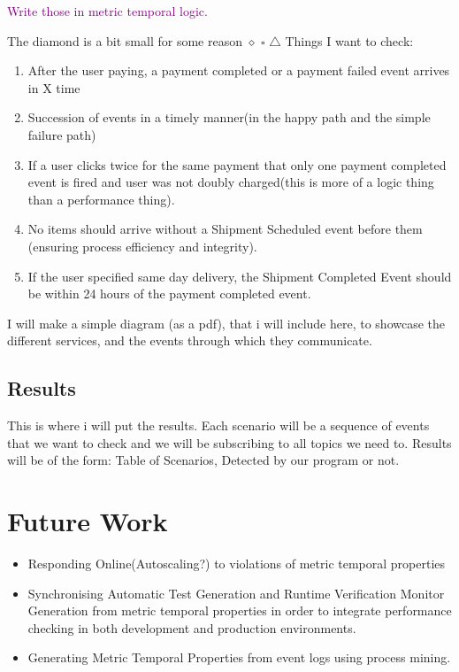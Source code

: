 \documentclass{article}
\newcommand{\note}[1] {
	\textcolor{Purple}{#1}

}
\begin{document}
\note{Write those in metric temporal logic.}

The diamond is a bit small for some reason
$\diamond$
$\square$
$\triangle$
Things I want to check:
\begin{enumerate}
	\item After the user paying, a payment completed or a payment failed event arrives in X time
	\item Succession of events in a timely manner(in the happy path and the simple failure path)
	\item If a user clicks twice for the same payment that only one payment completed event is fired and user was not doubly charged(this is more of a logic thing than a performance thing).
	\item No items should arrive without a Shipment Scheduled event before them (ensuring process efficiency and integrity).
	\item If the user specified same day delivery, the Shipment Completed Event should be within 24 hours of the payment completed event.
\end{enumerate}

I will make a simple diagram (as a pdf), that i will include here, to showcase the different services, and the events through which they communicate.

\subsection{Results}
This is where i will put the results. Each scenario will be a sequence of events that we want to check and we will be subscribing to all topics we need to.
Results will be of the form: Table of Scenarios, Detected by our program or not.

\section{Future Work}
\begin{itemize}
	\item Responding Online(Autoscaling?) to violations of metric temporal properties
	\item Synchronising Automatic Test Generation and Runtime Verification Monitor Generation from metric temporal properties in order to integrate performance checking in both development and production environments.
	\item Generating Metric Temporal Properties from event logs using process mining.
\end{itemize}
\end{document}
